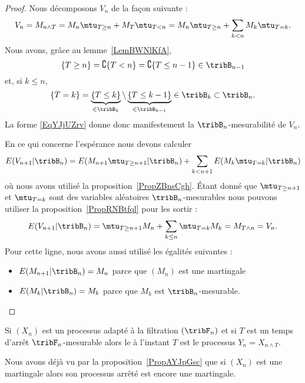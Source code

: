 \begin{proof}
	Nous décomposons \( V_n\) de la façon suivante :
	\begin{equation}    \label{EqYJjUZrv}
		V_n=M_{n\wedge T}=M_n\mtu_{T\geq n}+M_T\mtu_{T<n}=M_n\mtu_{T\geq n}+\sum_{k< n}M_k\mtu_{T=k}.
	\end{equation}
	Nous avons, grâce au lemme~\ref{LemBWNlKfA},
	\begin{equation}
		\{ T\geq n \}=\complement\{ T<n \}=\complement\{ T\leq n-1 \}\in\tribB_{n-1}
	\end{equation}
	et, si \( k\leq n\),
	\begin{equation}
		\{ T=k \}=\underbrace{\{ T\leq k \}}_{\in\tribB_k}\setminus\underbrace{\{ T\leq k-1 \}}_{\in\tribB_{k-1}}\in\tribB_k\subset\tribB_n.
	\end{equation}
	La forme \eqref{EqYJjUZrv} donne donc manifestement la \( \tribB_n\)-mesurabilité de \( V_n\).

	En ce qui concerne l'espérance nous devons calculer
	\begin{equation}
		E(V_{n+1}|\tribB_n)=E(M_{n+1}\mtu_{T\geq n+1}|\tribB_n)+\sum_{k<n+1}E(M_k\mtu_{T=k}|\tribB_n)
	\end{equation}
	où nous avons utilisé la proposition~\ref{PropZBnsCgh}. Étant donné que \( \mtu_{T\geq n+1}\) et \( \mtu_{T=k}\) sont des variables aléatoires \( \tribB_n\)-mesurables nous pouvons utiliser la proposition~\ref{PropRNBtfql} pour les sortir :
	\begin{equation}
		E(V_{n+1}|\tribB_n)=\mtu_{T\geq n+1}M_n+\sum_{k\leq n}\mtu_{T=k}M_k=M_{T\wedge n}=V_n.
	\end{equation}
	Pour cette ligne, nous avons aussi utilisé les égalités suivantes :
	\begin{itemize}
		\item
		      \( E(M_{n+1}|\tribB_n)=M_n\) parce que \( (M_n)\) est une martingale
		\item
		      \( E(M_k|\tribB_n)=M_k\) parce que \( M_k\) est \( \tribB_n\)-mesurable.
	\end{itemize}
\end{proof}

\begin{definition}
	Si \( (X_n)\) est un processus adapté à la filtration \( (\tribF_n)\) et si \( T\) est un temps d'arrêt \( \tribF_n\)-mesurable alors le  à l'instant \( T\) est le processus \( Y_n=X_{n\wedge T}\).
\end{definition}
Nous avons déjà vu par la proposition~\ref{PropAYJpGsc} que si \( (X_n)\) est une martingale alors son processus arrêté est encore une martingale.

